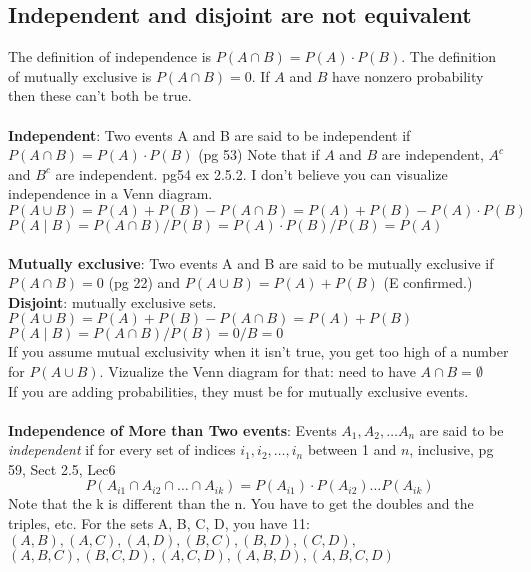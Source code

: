 	

\subsection{Independent and disjoint are not equivalent}
The definition of independence is $P(A \cap B) = P(A) \cdot P(B)$.  The definition of mutually exclusive is $P(A \cap B) = 0$.   If $A$ and $B$ have nonzero probability then these can't both be true.  \hfill \\
\hfill \\

\textbf{Independent}: Two events A and B are said to be independent if $P(A \cap B) = P(A) \cdot P(B)$ {\tiny (pg 53)} Note that if $A$ and $B$ are independent, $A^c$ and $B^c$ are independent. {\tiny pg54 ex 2.5.2.}  I don't believe you can visualize independence in a Venn diagram. \hfill \\ 
$P(A \cup B) = P(A) + P(B) - P(A \cap B) = P(A) + P(B) - P(A) \cdot P(B)$ \hfill \\
$P(A \mid B) = P(A \cap B)/P(B) = P(A) \cdot P(B)/P(B) = P(A)$ \hfill \\

\hfill \\
\textbf{Mutually exclusive}: Two events A and B are said to be mutually exclusive if $P(A \cap B) = 0$ {\tiny (pg 22)} and $P(A \cup B) = P(A) + P(B)$  {\tiny (E confirmed.)}
\textbf{Disjoint}: mutually exclusive sets. \hfill \\
$P(A \cup B) = P(A) + P(B) - P(A \cap B) = P(A) + P(B) $ \hfill \\
$P(A \mid B) = P(A \cap B)/P(B) = 0/B = 0 $ \hfill \\
If you assume mutual exclusivity when it isn't true, you get too high of a number for $P(A \cup B)$.  Vizualize the Venn diagram for that: need to have $A \cap B = \emptyset$ \hfill \\
If you are adding probabilities, they must be for mutually exclusive events. \hfill \\

\hfill \\
\textbf{Independence of More than Two events}:
Events $A_1, A_2, \dots  A_n$ are said to be \textit{independent} if for every set of indices $i_1, i_2, \dots, i_n$ between 1 and $n$, inclusive,  {\tiny pg 59, Sect 2.5, Lec6}
	\[ P(A_{i1} \cap A_{i2} \cap \dots \cap A_{ik}) = P(A_{i1}) \cdot P(A_{i2}) \dots P(A_{ik}) \]
Note that the k is different than the n.  You have to get the doubles and the triples, etc. 
For the sets A, B, C, D, you have 11: $(A, B), (A, C), (A, D), (B, C), (B, D), (C, D),$ \\
$(A, B, C), (B, C, D), (A, C, D), (A, B, D), (A, B, C, D)$ \hfill \\

